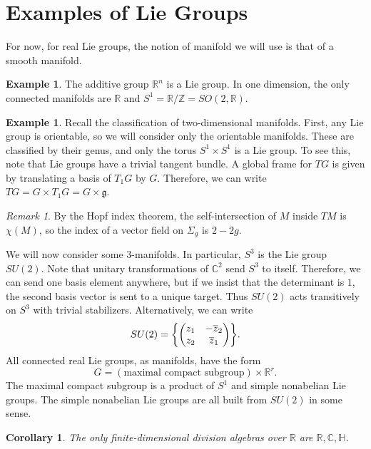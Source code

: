 \documentclass[leqno, openany]{memoir}
\newtheorem{cor}[thm]{Corollary}
\theoremstyle{definition}
\newtheorem{exm}[thm]{Example}
\theoremstyle{remark}
\newtheorem{rmk}[thm]{Remark}
\theoremstyle{plain}
\theoremstyle{definition}
\theoremstyle{remark}
\newcommand{\R}{\mathbb{R}}
\newcommand{\C}{\mathbb{C}}
\newcommand{\Z}{\mathbb{Z}}
\newcommand{\mf}[1]{\mathfrak{#1}}
\newcommand{\ol}[1]{\overline{#1}}
\begin{document}
\section{Examples of Lie Groups}%

For now, for real Lie groups, the notion of manifold we will use is that of a
smooth manifold.

\begin{exm} The additive group $\R^n$ is a Lie group. In one dimension, the
only connected manifolds are $\R$ and $S^1 = \R / \Z = SO(2,\R)$.  \end{exm}

\begin{exm} Recall the classification of two-dimensional manifolds. First, any
    Lie group is orientable, so we will consider only the orientable manifolds.
    These are classified by their genus, and only the torus $S^1 \times S^1$ is
    a Lie group. To see this, note that Lie groups have a trivial tangent
    bundle. A global frame for $TG$ is given by translating a basis of $T_1 G$
    by $G$. Therefore, we can write $TG = G \times T_1 G = G \times \mf{g}$.
\end{exm}

\begin{rmk} By the Hopf index theorem, the self-intersection of $M$ inside $TM$
is $\chi (M)$, so the index of a vector field on $\Sigma_g$ is $2 - 2g$.
\end{rmk}

We will now consider some $3$-manifolds. In particular, $S^3$ is the Lie group
$SU(2)$. Note that unitary transformations of $\C^2$ send $S^3$ to itself.
Therefore, we can send one basis element anywhere, but if we insist that the
determinant is $1$, the second basis vector is sent to a unique target. Thus
$SU(2)$ acts transitively on $S^3$ with trivial stabilizers. Alternatively, we
can write \[ SU(2) = \qty{ \begin{pmatrix} z_1 & -\ol{z}_2 \\ z_2 & \ol{z}_1
    \end{pmatrix} }. \] All connected real Lie groups, as manifolds, have the
    form \[ G = (\text{maximal compact subgroup}) \times \R^r. \] The maximal
    compact subgroup is a product of $S^1$ and simple nonabelian Lie groups.
    The simple nonabelian Lie groups are all built from $SU(2)$ in some sense.

\begin{cor} The only finite-dimensional division algebras over $\R$ are $\R,
\C, \mathbb{H}$.  \end{cor}
\end{document}
